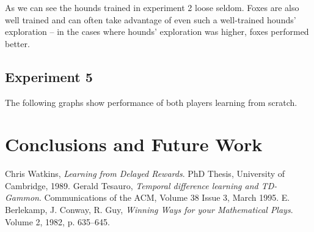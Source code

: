 \documentclass[a4paper]{article}
\begin{document}








As we can see the hounds trained in experiment 2 loose seldom. Foxes are also
well trained and can often take advantage of even such a well-trained hounds'
exploration -- in the cases where hounds' exploration was higher, foxes
performed better.

\subsection{Experiment 5}
The following graphs show performance of both players learning from scratch.









\section{Conclusions and Future Work}

\begin{thebibliography}{9}
    Chris Watkins,
    {\em Learning from Delayed Rewards}.
    PhD Thesis, University of Cambridge, 1989.
    Gerald Tesauro,
    {\em Temporal difference learning and TD-Gammon}.
    Communications of the ACM,
    Volume 38 Issue 3, March 1995.
    E. Berlekamp, J. Conway, R. Guy,
    {\em Winning Ways for your Mathematical Plays}.
    Volume 2, 1982, p. 635--645.
\end{thebibliography}
\end{document}
